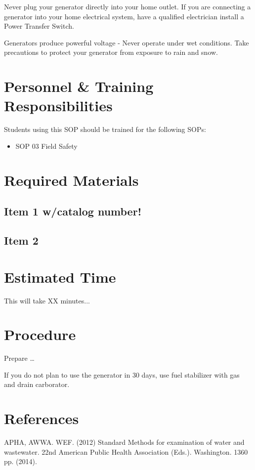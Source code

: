 \documentclass[12pt]{../SOP2}
\begin{document}
\NP Never plug your generator directly into your home outlet. If you are connecting a generator into your home electrical system, have a qualified electrician install a Power Transfer Switch.

\NP Generators produce powerful voltage - Never operate under wet conditions. Take precautions to protect your generator from exposure to rain and snow. 

\section{Personnel \& Training Responsibilities}

\NP \lipsum[1]

Students using this SOP should be trained for the following SOPs:

\begin{itemize}
  \item SOP 03 Field Safety
\end{itemize}


\section{Required Materials}

\subsection{Item 1 w/catalog number!}
\subsection{Item 2}

\section{Estimated Time}

\NP This will take XX minutes...

\section{Procedure}

\NP Prepare \dots

\NP If you do not plan to use the generator in 30 days, use fuel stabilizer with gas and drain carborator. 

\section{References}

\NP APHA, AWWA. WEF. (2012) Standard Methods for examination of water and wastewater. 22nd American Public Health Association (Eds.). Washington. 1360 pp. (2014).
\end{document}
